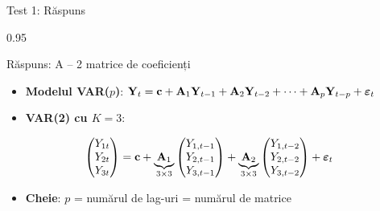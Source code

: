 \documentclass[9pt, aspectratio=169, t]{beamer}
\begin{document}
\begin{frame}{Test 1: Răspuns}
    \begin{cminipage}{0.95\textwidth}
    \begin{exampleblock}{Răspuns: A -- 2 matrice de coeficienți}
        \begin{itemize}\setlength{\itemsep}{0pt}
            \item \textbf{Modelul VAR($p$)}: $\mathbf{Y}_t = \mathbf{c} + \mathbf{A}_1\mathbf{Y}_{t-1} + \mathbf{A}_2\mathbf{Y}_{t-2} + \cdots + \mathbf{A}_p\mathbf{Y}_{t-p} + \boldsymbol{\varepsilon}_t$
        \end{itemize}

        \vspace{0.3cm}
        \begin{itemize}\setlength{\itemsep}{0pt}
            \item \textbf{VAR(2) cu $K=3$}:
        \end{itemize}
        \[
        \begin{pmatrix} Y_{1t} \\ Y_{2t} \\ Y_{3t} \end{pmatrix} = \mathbf{c} + \underbrace{\mathbf{A}_1}_{3\times 3}\begin{pmatrix} Y_{1,t-1} \\ Y_{2,t-1} \\ Y_{3,t-1} \end{pmatrix} + \underbrace{\mathbf{A}_2}_{3\times 3}\begin{pmatrix} Y_{1,t-2} \\ Y_{2,t-2} \\ Y_{3,t-2} \end{pmatrix} + \boldsymbol{\varepsilon}_t
        \]

        \begin{itemize}\setlength{\itemsep}{0pt}
            \item \textbf{Cheie}: $p$ = numărul de lag-uri = numărul de matrice
        \end{itemize}
    \end{exampleblock}
    \end{cminipage}
\end{frame}
\end{document}

